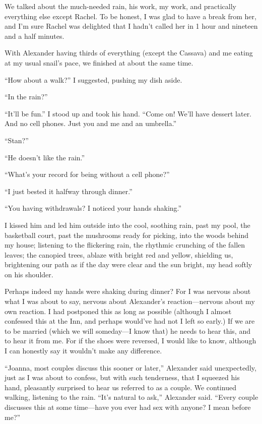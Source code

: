 We talked about the much-needed rain, his work, my work, and practically
everything else except Rachel. To be honest, I was glad to have a break
from her, and I'm sure Rachel was delighted that I hadn't called her in
1 hour and nineteen and a half minutes.

With Alexander having thirds of everything (except the Cassava) and me
eating at my usual snail's pace, we finished at about the same time.

``How about a walk?'' I suggested, pushing my dish aside.

``In the rain?''

``It'll be fun.'' I stood up and took his hand. ``Come on! We'll have
dessert later. And no cell phones. Just you and me and an umbrella.''

``Stan?''

``He doesn't like the rain.''

``What's your record for being without a cell phone?''

``I just bested it halfway through dinner.''

``You having withdrawals? I noticed your hands shaking.''

I kissed him and led him outside into the cool, soothing rain, past my
pool, the basketball court, past the mushrooms ready for picking, into
the woods behind my house; listening to the flickering rain, the
rhythmic crunching of the fallen leaves; the canopied trees, ablaze with
bright red and yellow, shielding us, brightening our path as if the day
were clear and the sun bright, my head softly on his shoulder.

Perhaps indeed my hands were shaking during dinner? For I was nervous
about what I was about to say, nervous about Alexander's
reaction---nervous about my own reaction. I had postponed this as long
as possible (although I almost confessed this at the Inn, and perhaps
would've had not I left so early.) If we are to be married (which we
will someday---I know that) he needs to hear this, and to hear it from
me. For if the shoes were reversed, I would like to know, although I can
honestly say it wouldn't make any difference.

``Joanna, most couples discuss this sooner or later,'' Alexander said
unexpectedly, just as I was about to confess, but with such tenderness,
that I squeezed his hand, pleasantly surprised to hear us referred to as
a couple. We continued walking, listening to the rain. ``It's natural to
ask,'' Alexander said. ``Every couple discusses this at some time---have
you ever had sex with anyone? I mean before me?''

